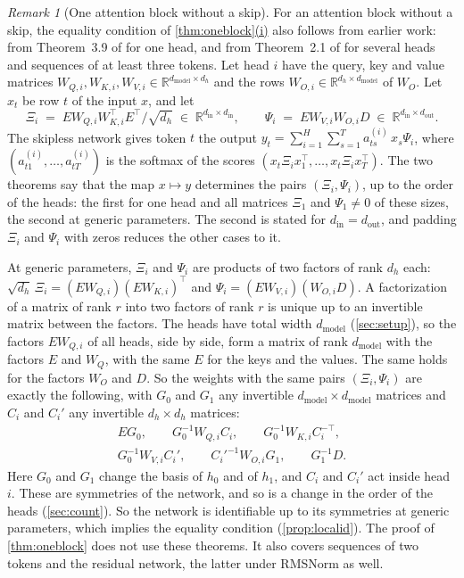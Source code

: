 \documentclass[10pt]{article}
\theoremstyle{definition}
\theoremstyle{remark}
\newtheorem{remark}[theorem]{Remark}
\newcommand{\R}{\mathbb{R}}
\newcommand{\dm}{d_{\mathrm{model}}}
\DeclareRobustCommand{\cpref}[2]{\hyperref[#1:#2]{\cref*{#1}(#2)}}
\begin{document}
\begin{remark}[One attention block without a skip]\label{rem:oneattn}
For an attention block without a skip, the equality condition of \cpref{thm:oneblock}{i} also follows from earlier work: from Theorem~3.9 of \citet{henry2025lightning} for one head, and from Theorem~2.1 of \citet{henry2026generic} for several heads and sequences of at least three tokens. Let head $i$ have the query, key and value matrices $W_{Q,i}, W_{K,i}, W_{V,i} \in \R^{\dm\times d_h}$ and the rows $W_{O,i} \in \R^{d_h\times\dm}$ of $W_O$. Let $x_t$ be row $t$ of the input $x$, and let
\[
\Xi_i \;=\; EW_{Q,i}W_{K,i}^\top E^\top\big/\sqrt{d_h} \;\in\; \R^{d_{\mathrm{in}}\times d_{\mathrm{in}}}, \qquad \Psi_i \;=\; EW_{V,i}W_{O,i}D \;\in\; \R^{d_{\mathrm{in}}\times d_{\mathrm{out}}}.
\]
The skipless network gives token $t$ the output $y_t = \sum_{i=1}^{H}\sum_{s=1}^{T} a^{(i)}_{ts}\,x_s\Psi_i$, where $(a^{(i)}_{t1}, \dots, a^{(i)}_{tT})$ is the softmax of the scores $(x_t\Xi_i x_1^\top, \dots, x_t\Xi_i x_T^\top)$. The two theorems say that the map $x \mapsto y$ determines the pairs $(\Xi_i, \Psi_i)$, up to the order of the heads: the first for one head and all matrices $\Xi_1$ and $\Psi_1 \neq 0$ of these sizes, the second at generic parameters. The second is stated for $d_{\mathrm{in}} = d_{\mathrm{out}}$, and padding $\Xi_i$ and $\Psi_i$ with zeros reduces the other cases to it.

At generic parameters, $\Xi_i$ and $\Psi_i$ are products of two factors of rank $d_h$ each: $\sqrt{d_h}\,\Xi_i = (EW_{Q,i})(EW_{K,i})^\top$ and $\Psi_i = (EW_{V,i})(W_{O,i}D)$. A factorization of a matrix of rank $r$ into two factors of rank $r$ is unique up to an invertible matrix between the factors. The heads have total width $\dm$ (\cref{sec:setup}), so the factors $EW_{Q,i}$ of all heads, side by side, form a matrix of rank $\dm$ with the factors $E$ and $W_Q$, with the same $E$ for the keys and the values. The same holds for the factors $W_O$ and $D$. So the weights with the same pairs $(\Xi_i, \Psi_i)$ are exactly the following, with $G_0$ and $G_1$ any invertible $\dm\times\dm$ matrices and $C_i$ and $C_i'$ any invertible $d_h\times d_h$ matrices:
\begin{gather*}
EG_0, \qquad G_0^{-1}W_{Q,i}C_i, \qquad G_0^{-1}W_{K,i}C_i^{-\top}, \\
G_0^{-1}W_{V,i}C_i', \qquad C_i'^{-1}W_{O,i}G_1, \qquad G_1^{-1}D.
\end{gather*}
Here $G_0$ and $G_1$ change the basis of $h_0$ and of $h_1$, and $C_i$ and $C_i'$ act inside head $i$. These are symmetries of the network, and so is a change in the order of the heads (\cref{sec:count}). So the network is identifiable up to its symmetries at generic parameters, which implies the equality condition (\cref{prop:localid}). The proof of \cref{thm:oneblock} does not use these theorems. It also covers sequences of two tokens and the residual network, the latter under RMSNorm as well.
\end{remark}
\end{document}
